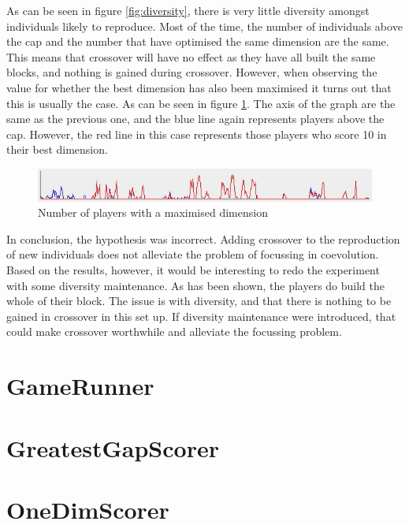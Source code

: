 \documentclass{article}
\begin{document}
As can be seen in figure \ref{fig:diversity}, there is very little diversity amongst individuals likely to reproduce. Most of the time, the number of individuals above the cap and the number that have optimised the same dimension are the same. This means that crossover will have no effect as they have all built the same blocks, and nothing is gained during crossover. However, when observing the value for whether the best dimension has also been maximised it turns out that this is usually the case. As can be seen in figure \ref{fig:optomised}. The axis of the graph are the same as the previous one, and the blue line again represents players above the cap. However, the red line in this case represents those players who score 10 in their best dimension.
\begin{figure}
  \centering
  \includegraphics[width=.6\linewidth]{Screencaps/optomised}
  \caption{Number of players with a maximised dimension}
  \label{fig:optomised}
\end{figure}
In conclusion, the hypothesis was incorrect. Adding crossover to the reproduction of new individuals does not alleviate the problem of focussing in coevolution. Based on the results, however, it would be interesting to redo the experiment with some diversity maintenance. As has been shown, the players do build the whole of their block. The issue is with diversity, and that there is nothing to be gained in crossover in this set up. If diversity maintenance were introduced, that could make crossover worthwhile and alleviate the focussing problem.



\appendix
\section{GameRunner}

\section{GreatestGapScorer}

\section{OneDimScorer}

\end{document}

